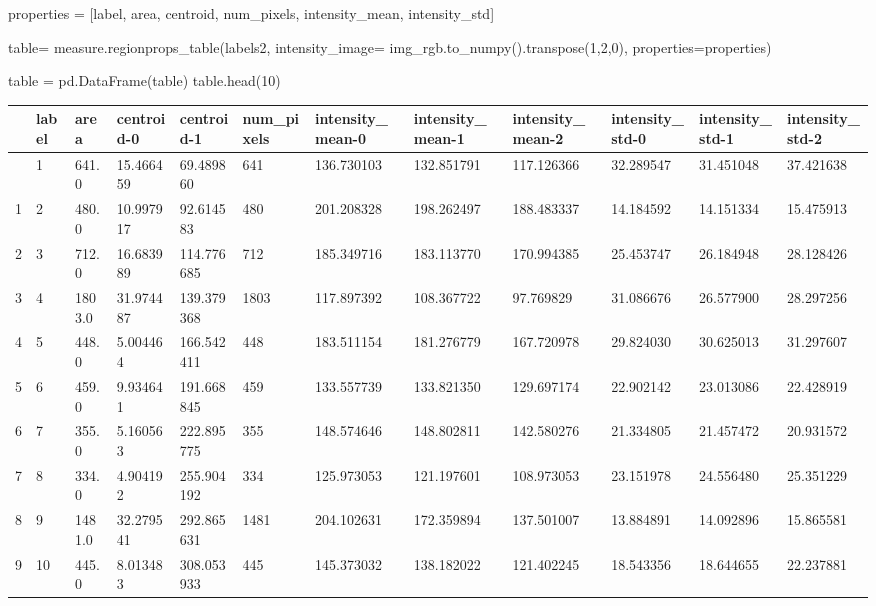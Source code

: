 \documentclass[
]{article}
\newenvironment{Shaded}{}{}
\newcommand{\DecValTok}[1]{\textcolor[rgb]{0.25,0.63,0.44}{#1}}
\newcommand{\NormalTok}[1]{#1}
\newcommand{\OperatorTok}[1]{\textcolor[rgb]{0.40,0.40,0.40}{#1}}
\newcommand{\StringTok}[1]{\textcolor[rgb]{0.25,0.44,0.63}{#1}}
\begin{document}
\label{39961565}
\label{cb35}
\begin{Shaded}
\begin{Highlighting}[]
\NormalTok{properties }\OperatorTok{=}\NormalTok{ [}\StringTok{\textquotesingle{}label\textquotesingle{}}\NormalTok{, }\StringTok{\textquotesingle{}area\textquotesingle{}}\NormalTok{, }\StringTok{\textquotesingle{}centroid\textquotesingle{}}\NormalTok{, }\StringTok{\textquotesingle{}num\_pixels\textquotesingle{}}\NormalTok{, }\StringTok{\textquotesingle{}intensity\_mean\textquotesingle{}}\NormalTok{, }\StringTok{\textquotesingle{}intensity\_std\textquotesingle{}}\NormalTok{]}

\NormalTok{table}\OperatorTok{=}\NormalTok{   measure.regionprops\_table(labels2, intensity\_image}\OperatorTok{=}\NormalTok{ img\_rgb.to\_numpy().transpose(}\DecValTok{1}\NormalTok{,}\DecValTok{2}\NormalTok{,}\DecValTok{0}\NormalTok{), properties}\OperatorTok{=}\NormalTok{properties)}

\NormalTok{table }\OperatorTok{=}\NormalTok{ pd.DataFrame(table)}
\NormalTok{table.head(}\DecValTok{10}\NormalTok{)}
\end{Highlighting}
\end{Shaded}

\begin{longtable}[]{@{}llllllllllll@{}}
\toprule\noalign{}
& label & area & centroid-0 & centroid-1 & num\_pixels &
intensity\_mean-0 & intensity\_mean-1 & intensity\_mean-2 &
intensity\_std-0 & intensity\_std-1 & intensity\_std-2 \\
\midrule\noalign{}
\endhead
\bottomrule\noalign{}
\endlastfoot
0 & 1 & 641.0 & 15.466459 & 69.489860 & 641 & 136.730103 & 132.851791 &
117.126366 & 32.289547 & 31.451048 & 37.421638 \\
1 & 2 & 480.0 & 10.997917 & 92.614583 & 480 & 201.208328 & 198.262497 &
188.483337 & 14.184592 & 14.151334 & 15.475913 \\
2 & 3 & 712.0 & 16.683989 & 114.776685 & 712 & 185.349716 & 183.113770 &
170.994385 & 25.453747 & 26.184948 & 28.128426 \\
3 & 4 & 1803.0 & 31.974487 & 139.379368 & 1803 & 117.897392 & 108.367722
& 97.769829 & 31.086676 & 26.577900 & 28.297256 \\
4 & 5 & 448.0 & 5.004464 & 166.542411 & 448 & 183.511154 & 181.276779 &
167.720978 & 29.824030 & 30.625013 & 31.297607 \\
5 & 6 & 459.0 & 9.934641 & 191.668845 & 459 & 133.557739 & 133.821350 &
129.697174 & 22.902142 & 23.013086 & 22.428919 \\
6 & 7 & 355.0 & 5.160563 & 222.895775 & 355 & 148.574646 & 148.802811 &
142.580276 & 21.334805 & 21.457472 & 20.931572 \\
7 & 8 & 334.0 & 4.904192 & 255.904192 & 334 & 125.973053 & 121.197601 &
108.973053 & 23.151978 & 24.556480 & 25.351229 \\
8 & 9 & 1481.0 & 32.279541 & 292.865631 & 1481 & 204.102631 & 172.359894
& 137.501007 & 13.884891 & 14.092896 & 15.865581 \\
9 & 10 & 445.0 & 8.013483 & 308.053933 & 445 & 145.373032 & 138.182022 &
121.402245 & 18.543356 & 18.644655 & 22.237881 \\
\end{longtable}
\end{document}
